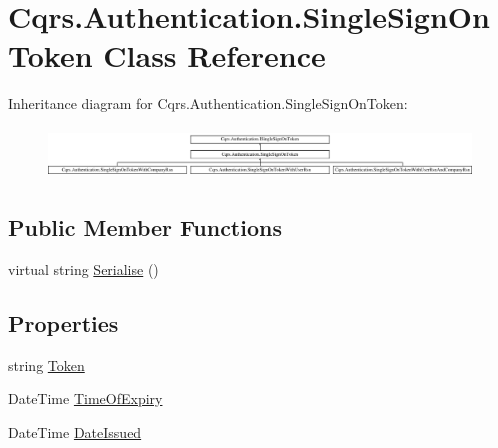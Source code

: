 \hypertarget{classCqrs_1_1Authentication_1_1SingleSignOnToken}{}\section{Cqrs.\+Authentication.\+Single\+Sign\+On\+Token Class Reference}
\label{classCqrs_1_1Authentication_1_1SingleSignOnToken}
Inheritance diagram for Cqrs.\+Authentication.\+Single\+Sign\+On\+Token\+:\begin{figure}[H]
\begin{center}
\leavevmode
\includegraphics[height=1.355932cm]{classCqrs_1_1Authentication_1_1SingleSignOnToken}
\end{center}
\end{figure}
\subsection*{Public Member Functions}
\begin{DoxyCompactItemize}
\item 
virtual string \hyperlink{classCqrs_1_1Authentication_1_1SingleSignOnToken_a5e859c6c5db5aaa9ef4e8f2086df4604}{Serialise} ()
\end{DoxyCompactItemize}
\subsection*{Properties}
\begin{DoxyCompactItemize}
\item 
string \hyperlink{classCqrs_1_1Authentication_1_1SingleSignOnToken_a7a704dd5d4f396e5c0b413b4b39e7406}{Token}
\item 
Date\+Time \hyperlink{classCqrs_1_1Authentication_1_1SingleSignOnToken_a3e9a9ee37ec53edd665e4e8d46f73f85}{Time\+Of\+Expiry}
\item 
Date\+Time \hyperlink{classCqrs_1_1Authentication_1_1SingleSignOnToken_aa0ea2d0654dd2aab23af98806663cd7c}{Date\+Issued}
\end{DoxyCompactItemize}


